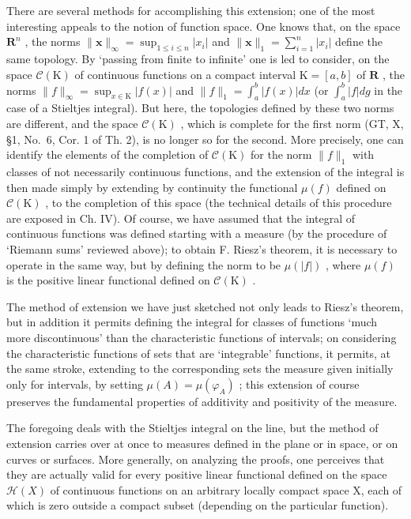 There are several methods for accomplishing this extension; one of the most interesting appeals to the notion of function space. One knows that, on the space \(\mathbf{R}^n\) , the norms \(\| \mathbf{x}\|_{\infty} = \sup_{1\leqslant i\leqslant n}|x_i|\) and \(\| \mathbf{x}\|_1 = \sum_{i=1}^{n}|x_i|\) define the same topology. By `passing from finite to infinite' one is led to consider, on the space \(\mathcal{C}(\mathrm{K})\) of continuous functions on a compact interval \(\mathrm{K} = [a,b]\) of \(\mathbf{R}\) , the norms \(\| f\|_{\infty} = \sup_{x\in \mathrm{K}}|f(x)|\) and \(\| f\|_1 = \int_a^b |f(x)|dx\) (or \(\int_a^b |f|dg\) in the case of a Stieltjes integral). But here, the topologies defined by these two norms are different, and the space \(\mathcal{C}(\mathrm{K})\) , which is complete for the first norm (GT, X, §1, No.~6, Cor. 1 of Th. 2), is no longer so for the second. More precisely, one can identify the elements of the completion of \(\mathcal{C}(\mathrm{K})\) for the norm \(\| f\|_1\) with classes of not necessarily continuous functions, and the extension of the integral is then made simply by extending by continuity the functional \(\mu(f)\) defined on \(\mathcal{C}(\mathrm{K})\) , to the completion of this space (the technical details of this procedure are exposed in Ch. IV). Of course, we have assumed that the integral of continuous functions was defined starting with a measure (by the procedure of `Riemann sums' reviewed above); to obtain F. Riesz's theorem, it is necessary to operate in the same way, but by defining the norm to be \(\mu(|f|)\) , where \(\mu(f)\) is the positive linear functional defined on \(\mathcal{C}(\mathrm{K})\) .

The method of extension we have just sketched not only leads to Riesz's theorem, but in addition it permits defining the integral for classes of functions `much more discontinuous' than the characteristic functions of intervals; on considering the characteristic functions of sets that are `integrable' functions, it permits, at the same stroke, extending to the corresponding sets the measure given initially only for intervals, by setting \(\mu(A) = \mu(\varphi_A)\) ; this extension of course preserves the fundamental properties of additivity and positivity of the measure.

The foregoing deals with the Stieltjes integral on the line, but the method of extension carries over at once to measures defined in the plane or in space, or on curves or surfaces. More generally, on analyzing the proofs, one perceives that they are actually valid for every positive linear functional defined on the space \(\mathcal{H}(X)\) of continuous functions on an arbitrary locally compact space X, each of which is zero outside a compact subset (depending on the particular function).

